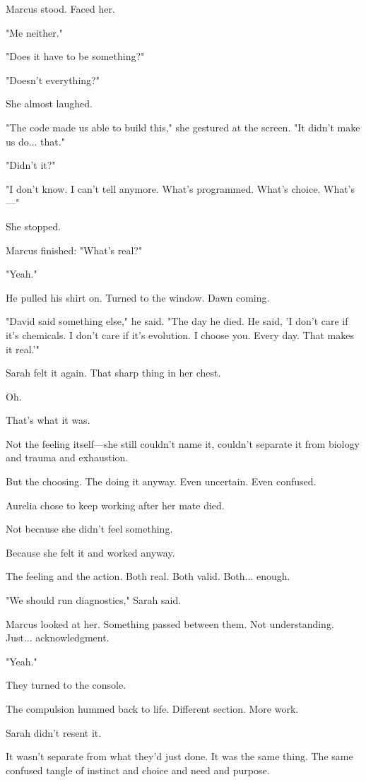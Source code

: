 Marcus stood. Faced her.

"Me neither."

"Does it have to be something?"

"Doesn't everything?"

She almost laughed.

"The code made us able to build this," she gestured at the screen. "It didn't make us do... that."

"Didn't it?"

"I don't know. I can't tell anymore. What's programmed. What's choice. What's—"

She stopped.

Marcus finished: "What's real?"

"Yeah."

He pulled his shirt on. Turned to the window. Dawn coming.

"David said something else," he said. "The day he died. He said, 'I don't care if it's chemicals. I don't care if it's evolution. I choose you. Every day. That makes it real.'"

Sarah felt it again. That sharp thing in her chest.

Oh.

That's what it was.

Not the feeling itself—she still couldn't name it, couldn't separate it from biology and trauma and exhaustion.

But the choosing. The doing it anyway. Even uncertain. Even confused.

Aurelia chose to keep working after her mate died.

Not because she didn't feel something.

Because she felt it and worked anyway.

The feeling and the action. Both real. Both valid. Both... enough.

"We should run diagnostics," Sarah said.

Marcus looked at her. Something passed between them. Not understanding. Just... acknowledgment.

"Yeah."

They turned to the console.

The compulsion hummed back to life. Different section. More work.

Sarah didn't resent it.

It wasn't separate from what they'd just done. It was the same thing. The same confused tangle of instinct and choice and need and purpose.

